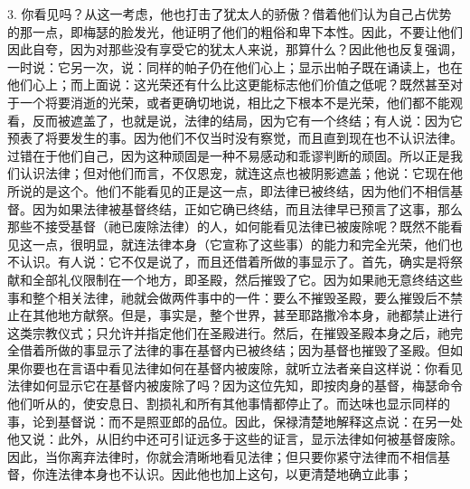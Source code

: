 3. 你看见吗？从这一考虑，他也打击了犹太人的骄傲？借着他们认为自己占优势的那一点，即梅瑟的脸发光，他证明了他们的粗俗和卑下本性。因此，不要让他们因此自夸，因为对那些没有享受它的犹太人来说，那算什么？因此他也反复强调，一时说：它另一次，说：同样的帕子仍在他们心上；显示出帕子既在诵读上，也在他们心上；而上面说：这光荣还有什么比这更能标志他们价值之低呢？既然甚至对于一个将要消逝的光荣，或者更确切地说，相比之下根本不是光荣，他们都不能观看，反而被遮盖了，也就是说，法律的结局，因为它有一个终结；有人说：因为它预表了将要发生的事。因为他们不仅当时没有察觉，而且直到现在也不认识法律。过错在于他们自己，因为这种顽固是一种不易感动和乖谬判断的顽固。所以正是我们认识法律；但对他们而言，不仅恩宠，就连这点也被阴影遮盖；他说：它现在他所说的是这个。他们不能看见的正是这一点，即法律已被终结，因为他们不相信基督。因为如果法律被基督终结，正如它确已终结，而且法律早已预言了这事，那么那些不接受基督（祂已废除法律）的人，如何能看见法律已被废除呢？既然不能看见这一点，很明显，就连法律本身（它宣称了这些事）的能力和完全光荣，他们也不认识。有人说：它不仅是说了，而且还借着所做的事显示了。首先，确实是将祭献和全部礼仪限制在一个地方，即圣殿，然后摧毁了它。因为如果祂无意终结这些事和整个相关法律，祂就会做两件事中的一件：要么不摧毁圣殿，要么摧毁后不禁止在其他地方献祭。但是，事实是，整个世界，甚至耶路撒冷本身，祂都禁止进行这类宗教仪式；只允许并指定他们在圣殿进行。然后，在摧毁圣殿本身之后，祂完全借着所做的事显示了法律的事在基督内已被终结；因为基督也摧毁了圣殿。但如果你要也在言语中看见法律如何在基督内被废除，就听立法者亲自这样说：你看见法律如何显示它在基督内被废除了吗？因为这位先知，即按肉身的基督，梅瑟命令他们听从的，使安息日、割损礼和所有其他事情都停止了。而达味也显示同样的事，论到基督说：而不是照亚郎的品位。因此，保禄清楚地解释这点说：在另一处他又说：此外，从旧约中还可引证远多于这些的证言，显示法律如何被基督废除。因此，当你离弃法律时，你就会清晰地看见法律；但只要你紧守法律而不相信基督，你连法律本身也不认识。因此他也加上这句，以更清楚地确立此事；\par

